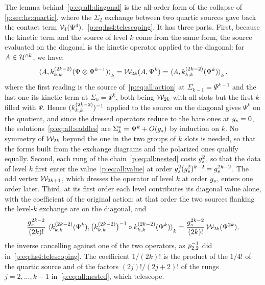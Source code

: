 The lemma behind~\eqref{p:eq:all:diagonal} is the all-order form of the collapse of \cref{p:sec:hs:quartic}, where the $\Sigma_2$ exchange between two quartic sources gave back the contact term $\mathcal{V}_{4}(\Psi^4)$,~\eqref{p:eq:hs4:telescoping}.
It has three parts.
First, because the kinetic term and the source of level $k$ come from the same form, the source evaluated on the diagonal is the kinetic operator applied to the diagonal: for $A \in \mathcal{H}^{\wedge k}$, we have:
\begin{equation}
  \label{p:eq:all:same-form}
  \pair[k]{A}{\kin{k}{}{2 k - 2}(\Psi \otimes \Psi^{k - 1})}
    = \dvertex{2 k}(A, \Psi^k)
    = \pair[k]{A}{\kin{k}{}{2 k - 2}(\Psi^k)},
\end{equation}
where the first reading is the source of~\eqref{p:eq:all:action} at $\Sigma_{k - 1} = \Psi^{k - 1}$ and the last one its kinetic term at $\Sigma_k = \Psi^k$, both being $\mathcal{W}_{2 k}$ with all slots but the first $k$ filled with $\Psi$.
Hence $(\kin{k}{}{2 k - 2})^{-1}$ applied to the source on the diagonal gives $\Psi^k$ on the quotient, and since the dressed operators reduce to the bare ones at $g_s = 0$, the solutions~\eqref{p:eq:all:saddles} are $\Sigma_k^* = \Psi^k + O(g_s)$ by induction on $k$.
No symmetry of $\mathcal{W}_{2 k}$ beyond the one in the two groups of $k$ slots is needed, so that the forms built from the exchange diagrams and the polarized ones qualify equally.
Second, each rung of the chain~\eqref{p:eq:all:nested} costs $g_s^2$, so that the data of level $k$ first enter the value~\eqref{p:eq:all:value} at order $g_s^2 (g_s^2)^{k - 2} = g_s^{2 k - 2}$.
The odd vertex $\mathcal{W}_{2 k + 1}$, which dresses the operator of level $k$ at order $g_s$, enters one order later.
Third, at its first order each level contributes its diagonal value alone, with the coefficient of the original action: at that order the two sources flanking the level-$k$ exchange are on the diagonal, and
\begin{equation}
  \label{p:eq:all:collapse}
  \frac{\gs^{2 k - 2}}{(2 k)!} \, \pair[k]{\kin{k}{}{2 k - 2}(\Psi^k)}{\big( \kin{k}{}{2 k - 2} \big)^{-1} \circ \kin{k}{}{2 k - 2}(\Psi^k)}
    = \frac{\gs^{2 k - 2}}{(2 k)!} \, \dvertex{2 k}(\Psi^{2 k}),
\end{equation}
the inverse cancelling against one of the two operators, as $p_{2,2}^{-1}$ did in~\eqref{p:eq:hs4:telescoping}.
The coefficient $1 / (2 k)!$ is the product of the $1 / 4!$ of the quartic source and of the factors $(2 j)! / (2 j + 2)!$ of the rungs $j = 2, \ldots, k - 1$ in~\eqref{p:eq:all:nested}, which telescope.
